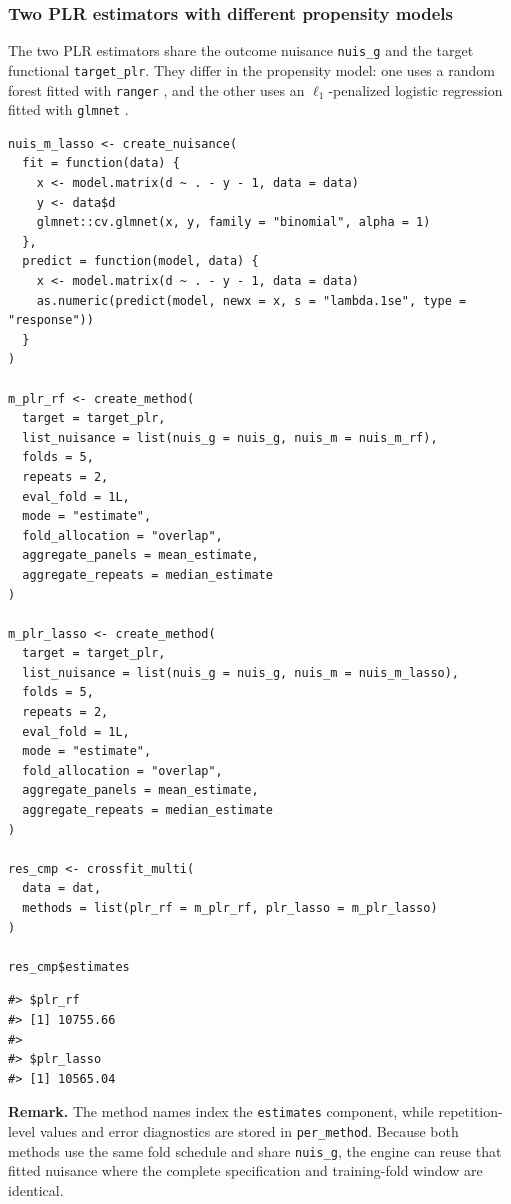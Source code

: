 \subsubsection{Two PLR estimators with different propensity models}\label{two-plr-estimators-with-different-propensity-models}

The two PLR estimators share the outcome nuisance \texttt{nuis\_g} and the target functional \texttt{target\_plr}. They differ in the propensity model: one uses a random forest fitted with \texttt{ranger} \citep{ranger}, and the other uses an \(\ell_1\)-penalized logistic regression fitted with \texttt{glmnet} \citep{friedman2010glmnet, tay2023glmnet}.

\begin{verbatim}
nuis_m_lasso <- create_nuisance(
  fit = function(data) {
    x <- model.matrix(d ~ . - y - 1, data = data)
    y <- data$d
    glmnet::cv.glmnet(x, y, family = "binomial", alpha = 1)
  },
  predict = function(model, data) {
    x <- model.matrix(d ~ . - y - 1, data = data)
    as.numeric(predict(model, newx = x, s = "lambda.1se", type = "response"))
  }
)

m_plr_rf <- create_method(
  target = target_plr,
  list_nuisance = list(nuis_g = nuis_g, nuis_m = nuis_m_rf),
  folds = 5,
  repeats = 2,
  eval_fold = 1L,
  mode = "estimate",
  fold_allocation = "overlap",
  aggregate_panels = mean_estimate,
  aggregate_repeats = median_estimate
)

m_plr_lasso <- create_method(
  target = target_plr,
  list_nuisance = list(nuis_g = nuis_g, nuis_m = nuis_m_lasso),
  folds = 5,
  repeats = 2,
  eval_fold = 1L,
  mode = "estimate",
  fold_allocation = "overlap",
  aggregate_panels = mean_estimate,
  aggregate_repeats = median_estimate
)

res_cmp <- crossfit_multi(
  data = dat,
  methods = list(plr_rf = m_plr_rf, plr_lasso = m_plr_lasso)
)

res_cmp$estimates
\end{verbatim}

\begin{verbatim}
#> $plr_rf
#> [1] 10755.66
#> 
#> $plr_lasso
#> [1] 10565.04
\end{verbatim}

\textbf{Remark.} The method names index the \texttt{estimates} component, while repetition-level values and error diagnostics are stored in \texttt{per\_method}. Because both methods use the same fold schedule and share \texttt{nuis\_g}, the engine can reuse that fitted nuisance where the complete specification and training-fold window are identical.

